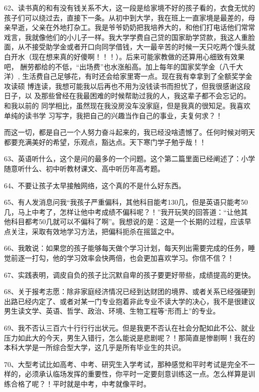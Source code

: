 \documentclass[11pt]{ctexart}
\begin{document}
{{{{62、读书真的和有没有钱关系不大，这一段是给家境不好的孩子看的，衣食无忧的
孩子们可以绕过去，直接下一条。从初中到大学，我在班上一直家境是最差的，母
亲早逝，父亲在外地打杂工。我是爷爷奶奶把我培养大的，和他们打电话他们常常
戏言，我就像他们的小儿子一样。我大学学费自己贷的国家助学贷款，我这人重脸
面，从不接受助学金或者开口向同学借钱，大一最辛苦的时候一天只吃两个馒头就
白开水（现在想来真的好傻啊！！！）。后来可能家教做的还算用心细致有效果吧，
酬劳都给的不低，“出场费”也水涨船高。加上每年的国家奖学金（八千大洋）,
生活费自己足够花，有时还会给家里寄一点。现在我有幸拿到了全额奖学金攻读硕
博连读，我想可能我以后再也不用为没钱读书而担忧了，但我很感谢这段日子，以
及那些曾经在我最困难的时候帮助过我的人，我这辈子都不会忘记的。和我以前的
同学相比，虽然现在我没房没车没家庭，但是我真的很知足。我喜欢单纯的读书学
习写字，我把自己的兴趣当作自己的事业，夫复何求？！


而这一切，都是自己一个人努力奋斗起来的，我已经没啥遗憾了。任何时候对明天
都要充满美好的希望，乐观点，豁达点。天下寒门学子勉乎哉！！


63、英语听什么，这个是问的最多的一个问题。这个第二篇里面已经阐述了：小学
随意听什么、初中听教材课文、高中听历年高考题。


64、不要让孩子太早接触网络，这个真的不是什么好东西。

65、有人发消息问我“我孩子严重偏科，其他科目能考130几，但是英语只能考50
几，马上中考了，怎样让他中考成绩不偏科呢？！”我开玩笑的回答道：“让他其
他科目都考50几就可以不偏科了啊”。我想说的是：这是一个长期的过程，应该早
点关注，采取有效地学习方法，把偏科扼杀在摇篮之中。


66、我敢说：如果您的孩子能够每天做个学习计划，每天列出需要完成的任务，睡
觉前逐一打勾，他的学习效率会快两倍，也会更加喜欢学习。你信不信？！


67、实践表明，调皮自负的孩子比沉默自卑的孩子要更好带些，成绩提高的更快。

68、关于报考志愿：除非家庭经济情况已经到达财团的境界、或者关系已经强硬到
出路已经内定了、或者对某一门专业抱着非此专业不读大学的决心，我不是很建议
男生读文学、英语、哲学、政治、环境、生物工程等“形而上”的专业。


69、我不否认三百六十行行行出状元。但是我更不否认在社会分配如此不公、就业
压力如此大的今天，男生入错行，怎么能说是悲剧呢？！那简直是惨剧啊！我在的
本科大学是一所综合型大学，这几乎是所有毕业生的共识。


70、大型考试比如高考、中考、研究生入学考试，那种感觉和平时考试是完全不一
样的，必须承认临场发挥的重要性，你平时一定要刻意训练这一点。怎么样算是训
练合格了呢？！平时就是中考，中考就像平时。


}}}}
\end{document}
